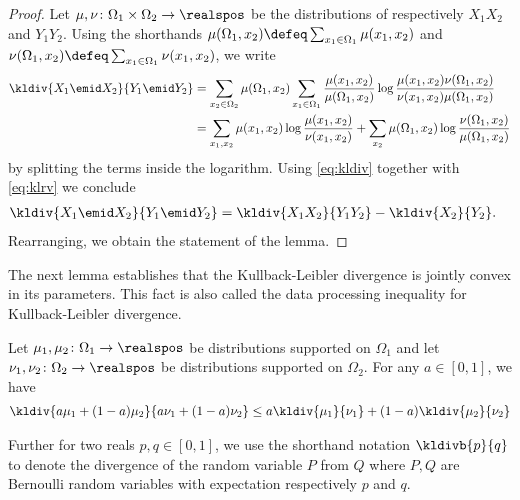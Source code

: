 \begin{proof}
Let $\mu,\nu\colon\Omega_1\times \Omega_2\to \realspos$
be the distributions of respectively $X_1X_2$ and $Y_1Y_2$.
Using the shorthands
$\mu(\Omega_1,x_2)\defeq\sum_{x_1\in\Omega_1}\mu(x_1,x_2)$
and 
$\nu(\Omega_1,x_2)\defeq\sum_{x_1\in\Omega_1}\nu(x_1,x_2)$,
we write
\begin{align*}
  \kldiv{X_1\emid X_2}{Y_1\emid Y_2} &=
     \sum_{x_2\in\Omega_2}\mu(\Omega_1,x_2)
       \sum_{x_1\in\Omega_1}\frac{\mu(x_1,x_2)}
           {\mu(\Omega_1,x_2)}
       \log\frac{\mu(x_1,x_2)\nu(\Omega_1,x_2)}
                {\nu(x_1,x_2)\mu(\Omega_1,x_2)}\\
  &= \sum_{x_1,x_2}\mu(x_1,x_2)
       \log\frac{\mu(x_1,x_2)}{\nu(x_1,x_2)} +
     \sum_{x_2}
       \mu(\Omega_1,x_2)\log\frac{\nu(\Omega_1,x_2)}
           {\mu(\Omega_1,x_2)}
\end{align*}
by splitting the terms inside the logarithm. 
Using \autoref{eq:kldiv} together with \autoref{eq:klrv}
 we conclude
\begin{align*}
\kldiv{X_1\emid X_2}{Y_1\emid Y_2}  &= \kldiv{X_1X_2}{Y_1Y_2} - \kldiv{X_2}{Y_2}.
\end{align*}
Rearranging, we obtain the statement of the lemma.
\end{proof}

The next lemma establishes that the Kullback-Leibler divergence
is jointly convex in its parameters. This fact is also called 
the data processing inequality for Kullback-Leibler divergence. 
\begin{lemma}
\label{lem:klconvex}
Let $\mu_1,\mu_2\colon\Omega_1\to\realspos$ be distributions
supported on $\Omega_1$ and let 
$\nu_1,\nu_2\colon\Omega_2\to\realspos$ be distributions
supported on $\Omega_2$. For any $a\in[0,1]$, we have 
\begin{align*}
\kldiv{a\mu_1 + (1-a)\mu_2}{a\nu_1 + (1-a)\nu_2}
  \le a\kldiv{\mu_1}{\nu_1} + (1-a)\kldiv{\mu_2}{\nu_2}
\end{align*}
\end{lemma}

Further for two reals $p,q\in[0,1]$, we use the shorthand notation 
$\kldivb{p}{q}$ to denote the divergence of the random variable $P$
from $Q$ where $P,Q$ are Bernoulli random variables with expectation
respectively $p$ and $q$.


